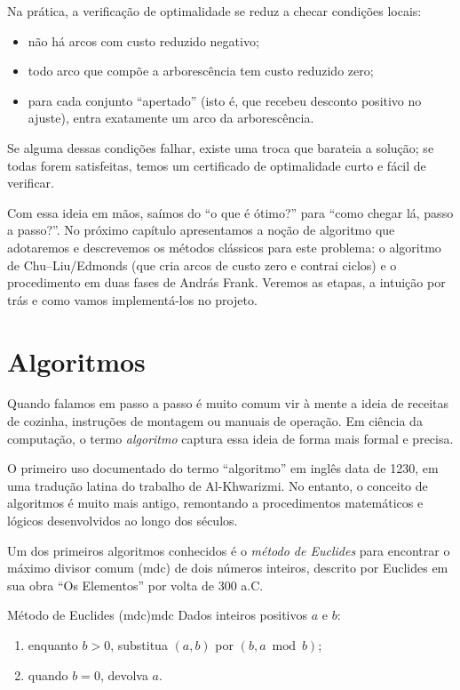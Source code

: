 Na prática, a verificação de optimalidade se reduz a checar condições locais:
\begin{itemize}\setlength{\itemsep}{2pt}
	\item não há arcos com custo reduzido negativo;
	\item todo arco que compõe a arborescência tem custo reduzido zero;
	\item para cada conjunto “apertado” (isto é, que recebeu desconto positivo no ajuste), entra exatamente um arco da arborescência.
\end{itemize}
Se alguma dessas condições falhar, existe uma troca que barateia a solução; se todas forem satisfeitas, temos um certificado de optimalidade curto e fácil de verificar.


Com essa ideia em mãos, saímos do “o que é ótimo?” para “como chegar lá, passo a passo?”. No próximo capítulo apresentamos a noção de algoritmo que adotaremos e descrevemos os métodos clássicos para este problema: o algoritmo de Chu–Liu/Edmonds (que cria arcos de custo zero e contrai ciclos) e o procedimento em duas fases de András Frank. Veremos as etapas, a intuição por trás e como vamos implementá-los no projeto.

\section{Algoritmos}

Quando falamos em passo a passo é muito comum vir à mente a ideia de receitas de cozinha, instruções de montagem ou manuais de operação. Em ciência da computação, o termo \emph{algoritmo} captura essa ideia de forma mais formal e precisa.

O primeiro uso documentado do termo “algoritmo” em inglês data de 1230, em uma tradução latina do trabalho de Al-Khwarizmi. No entanto, o conceito de algoritmos é muito mais antigo, remontando a procedimentos matemáticos e lógicos desenvolvidos ao longo dos séculos.


Um dos primeiros algoritmos conhecidos é o \emph{método de Euclides} para encontrar o máximo divisor comum (mdc) de dois números inteiros, descrito por Euclides em sua obra ``Os Elementos'' por volta de 300 a.C.


\begin{algobox}{Método de Euclides (mdc)}{mdc}
	Dados inteiros positivos $a$ e $b$:
	\begin{enumerate}\setlength{\itemsep}{2pt}
		\item enquanto $b>0$, substitua $(a,b)$ por $(b, a\bmod b)$;
		\item quando $b=0$, devolva $a$.
	\end{enumerate}
\end{algobox}


